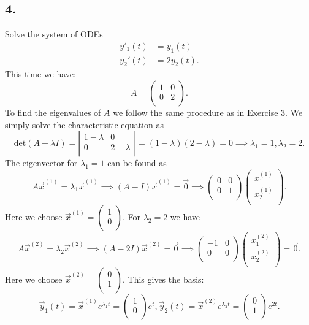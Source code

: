 \subsection*{4.} Solve the system of ODEs
\begin{align*}
  y'_1(t) &= y_1(t) \\
  y_2'(t) &= 2y_2(t)
.\end{align*}
\bigbreak
This time we have:
\[ 
A = \begin{pmatrix}
1 & 0\\
0 & 2\\
\end{pmatrix}
.\]
To find the eigenvalues of $A$ we follow the same procedure as in Exercise 3. We simply solve the characteristic equation as
\[ 
\mathrm{det}(A - \lambda I) = \left| \begin{array}{cc}
1 - \lambda & 0\\
0 & 2 - \lambda\\
\end{array} \right| = (1-\lambda)(2-\lambda) = 0 \implies \lambda_1 = 1, \lambda_2 = 2
.\]
The eigenvector for $\lambda_1 = 1$ can be found as
\[ 
A \Vec{x}^{(1)} = \lambda_1 \Vec{x}^{(1)} \implies (A-I) \Vec{x}^{(1)} = \Vec{0} \implies \begin{pmatrix}
0 & 0\\
0 & 1\\
\end{pmatrix} \begin{pmatrix}
x_1^{(1)}\\
x_2^{(1)}\\
\end{pmatrix}
.\]
Here we choose $\Vec{x}^{(1)} = \begin{pmatrix}
1\\
0\\
\end{pmatrix}$. For $\lambda_2 = 2$ we have
\[ 
A \Vec{x}^{(2)} = \lambda_2 \Vec{x}^{(2)} \implies (A - 2I) \Vec{x}^{(2)} = \Vec{0} \implies \begin{pmatrix}
  -1 & 0\\
  0 & 0\\
\end{pmatrix} \begin{pmatrix}
x_1^{(2)}\\
x_2^{(2)}\\
\end{pmatrix} = \Vec{0}
.\]
Here we choose $\Vec{x}^{(2)} = \begin{pmatrix}
0\\
1\\
\end{pmatrix}$. This gives the basis:
\[ 
\Vec{y}_1 (t) = \Vec{x}^{(1)} e^{\lambda_1 t} = \begin{pmatrix}
1\\
0\\
\end{pmatrix} e^{t}, \Vec{y}_2(t) = \Vec{x}^{(2)} e^{\lambda_2 t} = \begin{pmatrix}
0\\
1\\
\end{pmatrix} e^{2t}
.\]




